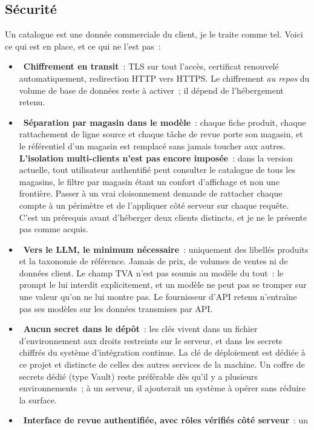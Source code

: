 \documentclass[11pt,a4paper]{article}
\newcommand{\ok}{\textcolor{okgreen}{\ding{51}}}
\newcommand{\pa}{\textcolor{amber}{\small\ding{108}}}
\begin{document}
\subsection{Sécurité}
Un catalogue est une donnée commerciale du client, je le traite comme tel. Voici ce qui est en
place, et ce qui ne l'est pas~:
\begin{itemize}
  \item \ok\ \textbf{Chiffrement en transit}~: TLS sur tout l'accès, certificat renouvelé
        automatiquement, redirection HTTP vers HTTPS.
        \pa{} Le chiffrement \emph{au repos} du volume de base de données reste à activer~; il
        dépend de l'hébergement retenu.
  \item \ok\ \textbf{Séparation par magasin dans le modèle}~: chaque fiche produit, chaque
        rattachement de ligne source et chaque tâche de revue porte son magasin, et le référentiel
        d'un magasin est remplacé sans jamais toucher aux autres.
        \pa{} \textbf{L'isolation multi-clients n'est pas encore imposée}~: dans la version
        actuelle, tout utilisateur authentifié peut consulter le catalogue de tous les magasins, le
        filtre par magasin étant un confort d'affichage et non une frontière. Passer à un vrai
        cloisonnement demande de rattacher chaque compte à un périmètre et de l'appliquer côté
        serveur sur chaque requête. C'est un prérequis avant d'héberger deux clients distincts, et
        je ne le présente pas comme acquis.
  \item \ok\ \textbf{Vers le LLM, le minimum nécessaire}~: uniquement des libellés produits et la
        taxonomie de référence. Jamais de prix, de volumes de ventes ni de données client. Le champ
        TVA n'est pas soumis au modèle du tout~: le prompt le lui interdit explicitement, et un
        modèle ne peut pas se tromper sur une valeur qu'on ne lui montre pas. Le fournisseur d'API
        retenu n'entraîne pas ses modèles sur les données transmises par API.
  \item \ok\ \textbf{Aucun secret dans le dépôt}~: les clés vivent dans un fichier d'environnement
        aux droits restreints sur le serveur, et dans les secrets chiffrés du système
        d'intégration continue. La clé de déploiement est dédiée à ce projet et distincte de celles
        des autres services de la machine.
        \pa{} Un coffre de secrets dédié (type Vault) reste préférable dès qu'il y a plusieurs
        environnements~; à un serveur, il ajouterait un système à opérer sans réduire la surface.
  \item \ok\ \textbf{Interface de revue authentifiée, avec rôles vérifiés côté serveur}~: un

\end{itemize}
\end{document}
